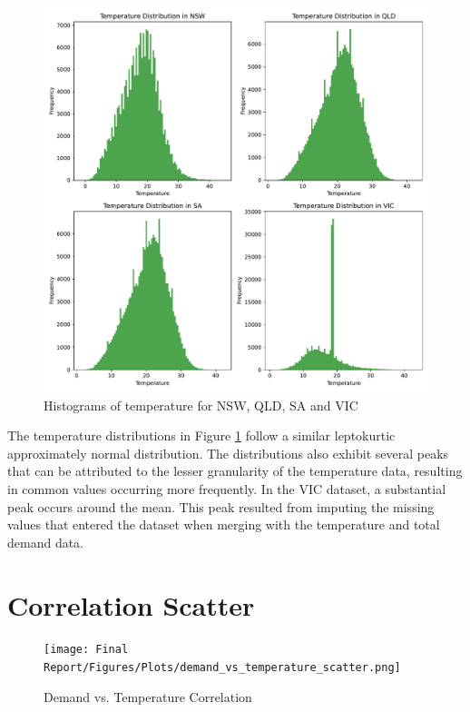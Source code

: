 \documentclass[mstat,12pt]{unswthesis}
\begin{document}
\begin{figure}[H]
\centerline{\includegraphics[width=\columnwidth]{Final Report/Figures/Plots/temperature_distribution.pdf}}
\caption{Histograms of temperature for NSW, QLD, SA and VIC}
\label{temperature-distributions-plot}
\end{figure}

The temperature distributions in Figure \ref{temperature-distributions-plot} follow a similar leptokurtic approximately normal distribution. The distributions also exhibit several peaks that can be attributed to the lesser granularity of the temperature data, resulting in common values occurring more frequently. In the VIC dataset, a substantial peak occurs around the mean. This peak resulted from imputing the missing values that entered the dataset when merging with the temperature and total demand data.

\hypertarget{correlation-scatter}{%
\section{Correlation Scatter}\label{correlation-scatter}}

\begin{figure}[H]
\centerline{\texttt{[image: Final Report/Figures/Plots/demand\_vs\_temperature\_scatter.png]}}
\caption{Demand vs. Temperature Correlation}
\label{correlation-scatter-plot}
\end{figure}
\end{document}
